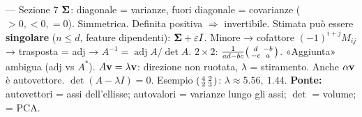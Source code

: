 \begin{appunti}{— Sezione 7}
 $\bm{\Sigma}$: diagonale = varianze, fuori diagonale = covarianze ($>0,<0,=0$). Simmetrica. Definita positiva $\Rightarrow$ invertibile. Stimata può essere \textbf{singolare} ($n\le d$, feature dipendenti): $\bm{\Sigma}+\varepsilon I$.
 Minore → cofattore $(-1)^{i+j}M_{ij}$ → trasposta = adj → $A^{-1}=\operatorname{adj}A/\det A$. $2\times2$: $\frac1{ad-bc}\begin{psmallmatrix}d&-b\\-c&a\end{psmallmatrix}$. «Aggiunta» ambigua (adj vs $A^*$).
 $A\mathbf{v}=\lambda\mathbf{v}$: direzione non ruotata, $\lambda$ = stiramento. Anche $\alpha\mathbf{v}$ è autovettore.
 $\det(A-\lambda I)=0$. Esempio $\begin{psmallmatrix}4&2\\2&3\end{psmallmatrix}$: $\lambda\approx5.56,\ 1.44$.
\textbf{Ponte:} autovettori = assi dell'ellisse; autovalori = varianze lungo gli assi; $\det$ = volume; = PCA.
\end{appunti}
